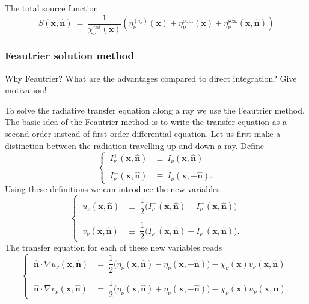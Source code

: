 \documentclass[]{article}
\begin{document}
The total source function
\begin{equation}
S(\textbf{x}, \hat{\textbf{n}}) \ = \ \frac{1}{\chi^{\text{tot}}_{\nu}(\textbf{x})} \left( \eta^{(ij)}_{\nu}(\textbf{x}) + \eta^{\text{con.}}_{\nu}(\textbf{x}) + \eta^{\text{sca.}}_{\nu}(\textbf{x}, \hat{\textbf{n}}) \right)
\end{equation}


\subsubsection{Feautrier solution method}

Why Feautrier? What are the advantages compared to direct integration? Give motivation!

\bigskip

To solve the radiative transfer equation along a ray we use the Feautrier method. The basic idea of the Feautrier method is to write the transfer equation as a second order instead of first order differential equation. Let us first make a distinction between the radiation travelling up and down a ray. Define
\begin{equation}
\begin{cases}
\ I^{+}_{\nu}(\textbf{x},\hat{\textbf{n}})  &\equiv \ I_{\nu}(\textbf{x},\hat{\textbf{n}}) \\ \\
\ I^{-}_{\nu}(\textbf{x},\hat{\textbf{n}})  &\equiv \ I_{\nu}(\textbf{x},-\hat{\textbf{n}}) .
\end{cases}
\end{equation}
Using these definitions we can introduce the new variables
\begin{equation}
\begin{cases}
\ u_{\nu}(\textbf{x},\hat{\textbf{n}})  &\equiv \ \dfrac{1}{2}\Big( I^{+}_{\nu}(\textbf{x},\hat{\textbf{n}}) + I^{-}_{\nu}(\textbf{x},\hat{\textbf{n}}) \Big) \\ \\
\ v_{\nu}(\textbf{x},\hat{\textbf{n}})  &\equiv \ \dfrac{1}{2}\Big( I^{+}_{\nu}(\textbf{x},\hat{\textbf{n}}) - I^{-}_{\nu}(\textbf{x},\hat{\textbf{n}}) \Big) .
\end{cases}
\end{equation}
The transfer equation for each of these new variables reads
\begin{equation}
\begin{cases}
\ \hat{\textbf{n}} \cdot \nabla u_{\nu}(\textbf{x},\hat{\textbf{n}}) &= \ \dfrac{1}{2} \Big( \eta_{\nu}(\textbf{x},\hat{\textbf{n}}) - \eta_{\nu}(\textbf{x},-\hat{\textbf{n}}) \Big) - \chi_{\nu}(\textbf{x}) v_{\nu}(\textbf{x},\hat{\textbf{n}}) \\ \\
\ \hat{\textbf{n}} \cdot \nabla v_{\nu}(\textbf{x},\hat{\textbf{n}}) &= \ \dfrac{1}{2} \Big( \eta_{\nu}(\textbf{x},\hat{\textbf{n}}) + \eta_{\nu}(\textbf{x},-\hat{\textbf{n}}) \Big) - \chi_{\nu}(\textbf{x}) u_{\nu}(\textbf{x},\hat{\textbf{n}}) .
\end{cases}
\label{uv}
\end{equation}
\end{document}
